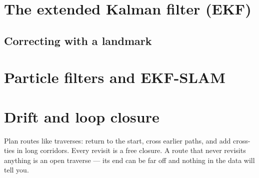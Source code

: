 
\section{The extended Kalman filter (EKF)}

\subsection{Correcting with a landmark}


\section{Particle filters and EKF-SLAM}


\section{Drift and loop closure}


\begin{tip}
Plan routes like traverses: return to the start, cross earlier paths, and add cross-ties in long corridors. Every revisit is a free closure. A route that never revisits anything is an open traverse --- its end can be far off and nothing in the data will tell you.
\end{tip}

